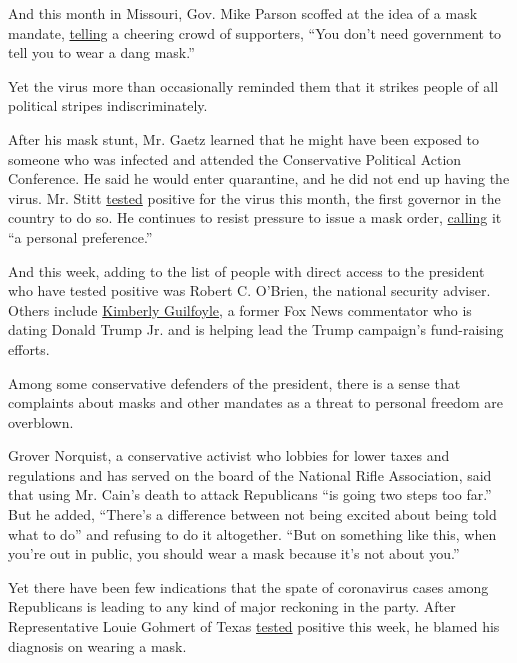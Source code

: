 And this month in Missouri, Gov. Mike Parson scoffed at the idea of a
mask mandate,
\href{https://www.stltoday.com/news/local/govt-and-politics/mixed-messages-despite-state-guidance-parson-goes-maskless-calls-coverings-dang-masks/article_b4023aa1-e4a3-522a-bbdf-280902abdd73.html}{telling}
a cheering crowd of supporters, ``You don't need government to tell you
to wear a dang mask.''

Yet the virus more than occasionally reminded them that it strikes
people of all political stripes indiscriminately.

After his mask stunt, Mr. Gaetz learned that he might have been exposed
to someone who was infected and attended the Conservative Political
Action Conference. He said he would enter quarantine, and he did not end
up having the virus. Mr. Stitt
\href{https://www.nytimes.com/2020/07/15/us/oklahoma-governor-coronavirus-stitt.html}{tested}
positive for the virus this month, the first governor in the country to
do so. He continues to resist pressure to issue a mask order,
\href{https://tulsaworld.com/news/state-and-regional/oklahoma-governor-wont-mandate-masks-to-me-thats-a-personal-preference/article_d45a63b6-20df-5282-89d7-1cdc60defdac.html}{calling}
it ``a personal preference.''

And this week, adding to the list of people with direct access to the
president who have tested positive was Robert C. O'Brien, the national
security adviser. Others include
\href{https://www.nytimes.com/2020/07/03/us/politics/kimberly-guilfoyle-trump-campaign-coronavirus.html}{Kimberly
Guilfoyle}, a former Fox News commentator who is dating Donald Trump Jr.
and is helping lead the Trump campaign's fund-raising efforts.

Among some conservative defenders of the president, there is a sense
that complaints about masks and other mandates as a threat to personal
freedom are overblown.

Grover Norquist, a conservative activist who lobbies for lower taxes and
regulations and has served on the board of the National Rifle
Association, said that using Mr. Cain's death to attack Republicans ``is
going two steps too far.'' But he added, ``There's a difference between
not being excited about being told what to do'' and refusing to do it
altogether. ``But on something like this, when you're out in public, you
should wear a mask because it's not about you.''

Yet there have been few indications that the spate of coronavirus cases
among Republicans is leading to any kind of major reckoning in the
party. After Representative Louie Gohmert of Texas
\href{https://www.nytimes.com/2020/07/29/us/politics/louie-gohmert-positive-coronavirus-mask.html}{tested}
positive this week, he blamed his diagnosis on wearing a mask.

